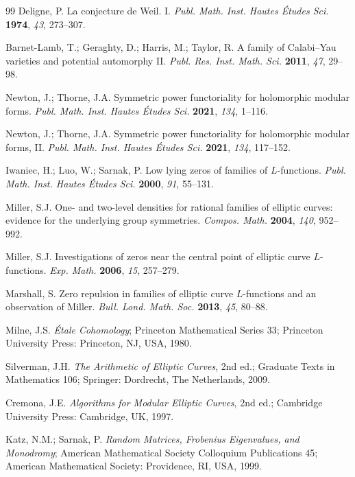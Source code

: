 \documentclass[11pt,reqno]{amsart}
\theoremstyle{remark}
\begin{document}
\begin{thebibliography}{99}
Deligne, P. La conjecture de Weil. I. \emph{Publ. Math. Inst. Hautes \'Etudes Sci.} \textbf{1974}, \emph{43}, 273--307.

Barnet-Lamb, T.; Geraghty, D.; Harris, M.; Taylor, R. A family of Calabi--Yau varieties and potential automorphy II. \emph{Publ. Res. Inst. Math. Sci.} \textbf{2011}, \emph{47}, 29--98.

Newton, J.; Thorne, J.A. Symmetric power functoriality for holomorphic modular forms. \emph{Publ. Math. Inst. Hautes \'Etudes Sci.} \textbf{2021}, \emph{134}, 1--116.

Newton, J.; Thorne, J.A. Symmetric power functoriality for holomorphic modular forms, II. \emph{Publ. Math. Inst. Hautes \'Etudes Sci.} \textbf{2021}, \emph{134}, 117--152.

Iwaniec, H.; Luo, W.; Sarnak, P. Low lying zeros of families of $L$-functions. \emph{Publ. Math. Inst. Hautes \'Etudes Sci.} \textbf{2000}, \emph{91}, 55--131.

Miller, S.J. One- and two-level densities for rational families of elliptic curves: evidence for the underlying group symmetries. \emph{Compos. Math.} \textbf{2004}, \emph{140}, 952--992.

Miller, S.J. Investigations of zeros near the central point of elliptic curve $L$-functions. \emph{Exp. Math.} \textbf{2006}, \emph{15}, 257--279.

Marshall, S. Zero repulsion in families of elliptic curve $L$-functions and an observation of Miller. \emph{Bull. Lond. Math. Soc.} \textbf{2013}, \emph{45}, 80--88.

Milne, J.S. \emph{\'Etale Cohomology}; Princeton Mathematical Series 33; Princeton University Press: Princeton, NJ, USA, 1980.

Silverman, J.H. \emph{The Arithmetic of Elliptic Curves}, 2nd ed.; Graduate Texts in Mathematics 106; Springer: Dordrecht, The Netherlands, 2009.

Cremona, J.E. \emph{Algorithms for Modular Elliptic Curves}, 2nd ed.; Cambridge University Press: Cambridge, UK, 1997.

Katz, N.M.; Sarnak, P. \emph{Random Matrices, Frobenius Eigenvalues, and Monodromy}; American Mathematical Society Colloquium Publications 45; American Mathematical Society: Providence, RI, USA, 1999.


\end{thebibliography}
\end{document}

